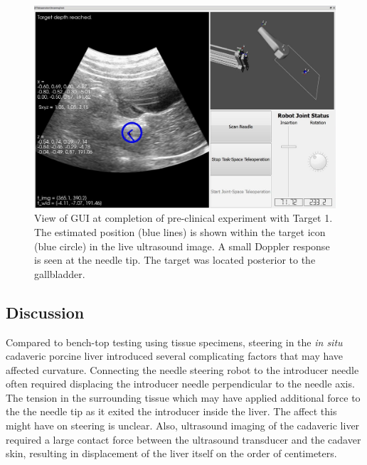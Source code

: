 \begin{figure}[!t]
\centering
\includegraphics[width = \columnwidth]{./Images/Chapter5/CadaverAtTarget/CadaverAtTarget.jpg}%
\caption[GUI at completion of pre-clinical experiment]{View of GUI at completion of pre-clinical experiment with Target 1. The estimated position (blue lines) is shown within the target icon (blue circle) in the live ultrasound image. A small Doppler response is seen at the needle tip. The target was located posterior to the gallbladder.}
\label{fig:CadaverAtTarget}
\end{figure}  

\subsection{Discussion}
Compared to bench-top testing using tissue specimens, steering in the \textit{in situ} cadaveric porcine liver introduced several complicating factors that may have affected curvature. Connecting the needle steering robot to the introducer needle often required displacing the introducer needle perpendicular to the needle axis. The tension in the surrounding tissue which may have applied additional force to the the needle tip as it exited the introducer inside the liver. The affect this might have on steering is unclear. Also, ultrasound imaging of the cadaveric liver required a large contact force between the ultrasound transducer and the cadaver skin, resulting in displacement of the liver itself on the order of centimeters. 

